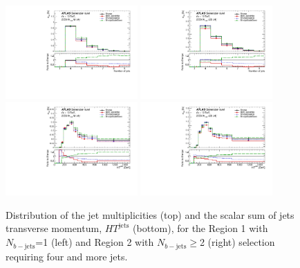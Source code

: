 \begin{figure}[!htb]
\centering
\includegraphics[width=0.45\textwidth]{Plots/ttV/generator/c_Region_0_nJets}
\includegraphics[width=0.45\textwidth]{Plots/ttV/generator/c_Region_1_nJets}\\
\includegraphics[width=0.45\textwidth]{Plots/ttV/generator/c_Region_0_HT_jets}
\includegraphics[width=0.45\textwidth]{Plots/ttV/generator/c_Region_1_HT_jets}\\
  \caption{Distribution of the jet multiplicities (top) and the scalar sum of jets transverse momentum, $HT^{\text{jets}}$ (bottom), for the Region 1 with $N_{b-\mathrm{jets}}$=1 (left) and Region 2 with $N_{b-\mathrm{jets}}\geq$2 (right) selection requiring four and more jets.  \label{ttV:den_4j12b}}
\end{figure}


